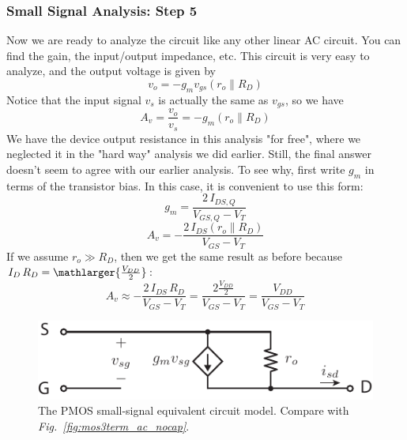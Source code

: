 \subsubsection{Small Signal Analysis:  Step 5}
Now we are ready to analyze the circuit like any other linear AC circuit.  You can find the gain, the input/output impedance, etc.  This circuit is very easy to analyze, and the output voltage is given by
    \begin{equation}
        v_o = -g_m v_{gs} \left( r_o \parallel R_D \right)
    \end{equation}
Notice that the input signal $v_s$ is actually the same as $v_{gs}$, so we have
    \begin{equation}
        A_v = \frac{v_o}{v_s} = -g_m\left( r_o \parallel R_D \right)
    \end{equation}
We have the device output resistance in this analysis "for free", where we neglected it in the "hard way" analysis we did earlier.  Still, the final answer doesn't seem to agree with our earlier analysis.  To see why, first write $g_m$ in terms of the transistor bias.  In this case, it is convenient to use this form:
    \begin{equation}
        g_m = \frac{2\,I_{DS,Q}}{V_{GS,Q} - V_T}
    \end{equation}
    \begin{equation}
        A_v =  -\frac{2\,I_{DS}\left( r_o \parallel R_D \right)}{V_{GS} - V_T}
    \end{equation}
If we assume $r_o \gg R_D$, then we get the same result as before because $I_D\,R_D = \mathlarger{\frac{V_{DD}}{2}}$:
    \begin{equation}
        A_v \approx  -\frac{2\,I_{DS}\,R_D}{V_{GS} - V_T} = \frac{2\frac{V_{DD}}{2}}{V_{GS} - V_T} = \frac{V_{DD}}{V_{GS} - V_T}
    \end{equation}
\newpage
\begin{figure}[t]
\centering
\includegraphics[scale=1.5]{pmos3term_dc}
\caption{The PMOS small-signal equivalent circuit model.  Compare with \emph{Fig.~\ref{fig:mos3term_ac_nocap}}.}
\label{fig:pmos3term_dc}
\end{figure}
